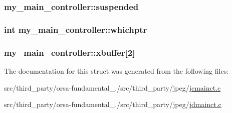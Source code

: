 \subsubsection[{suspended}]{ my\+\_\+main\+\_\+controller\+::suspended}\label{structmy__main__controller_aaae0f416fa5716cf5e0d295a191b2186}
\hypertarget{structmy__main__controller_a9838025ca47813221e8c208ad26bb9e8}{}
\subsubsection[{whichptr}]{\setlength{\rightskip}{0pt plus 5cm}int my\+\_\+main\+\_\+controller\+::whichptr}\label{structmy__main__controller_a9838025ca47813221e8c208ad26bb9e8}
\hypertarget{structmy__main__controller_a29fc35521c04489fdb6b7a7e758fb82a}{}
\subsubsection[{xbuffer}]{ my\+\_\+main\+\_\+controller\+::xbuffer\mbox{[}2\mbox{]}}\label{structmy__main__controller_a29fc35521c04489fdb6b7a7e758fb82a}


The documentation for this struct was generated from the following files\+:\begin{DoxyCompactItemize}
\item 
src/third\+\_\+party/orsa-\/fundamental\+\_./src/third\+\_\+party/jpeg/\hyperlink{jcmainct_8c}{jcmainct.\+c}\item 
src/third\+\_\+party/orsa-\/fundamental\+\_./src/third\+\_\+party/jpeg/\hyperlink{jdmainct_8c}{jdmainct.\+c}\end{DoxyCompactItemize}
